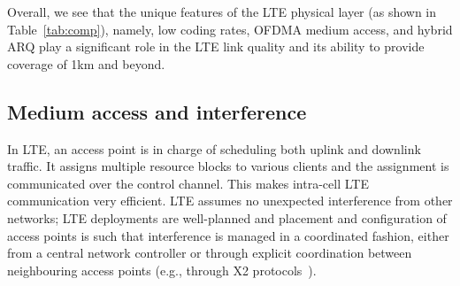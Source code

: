 

Overall, we see that the unique features of the LTE physical layer (as shown in Table~\ref{tab:comp}), namely, 
low coding rates, OFDMA medium access, and hybrid ARQ play a significant role in the LTE link quality and its ability to provide coverage of 1km and beyond. 



\subsection{Medium access and interference}
\label{sec:MAC}




In LTE, an access point is in charge of scheduling both uplink and downlink traffic. 
It assigns multiple resource blocks to various clients and the assignment is communicated over the control channel. 
This makes intra-cell LTE communication very efficient. 
LTE assumes no unexpected interference from other networks; 
LTE deployments are well-planned and placement and configuration of access points is such that interference is managed in a coordinated fashion, 
either from a central network controller or through explicit coordination between neighbouring access points
(e.g., through X2 protocols~\cite{36_423}).

